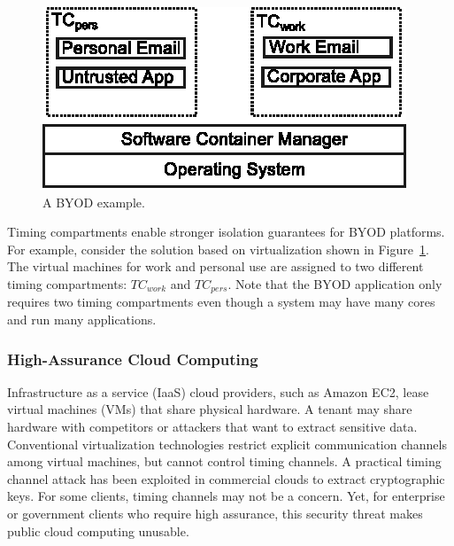 \begin{figure}
    \begin{center}
        \includegraphics{figs/byod.eps}
        \caption{A BYOD example.}
        \label{fig:byod}
        \vspace{-0.2in}
    \end{center}
\end{figure}

Timing compartments enable stronger isolation guarantees for BYOD
platforms. For example, consider the solution based on virtualization shown in 
Figure~\ref{fig:byod}. The virtual machines for
work and personal use are assigned to two different timing compartments:
$TC_{work}$ and $TC_{pers}$. 
Note that the BYOD application only requires two timing compartments even
though a system may have many cores and run many applications.

\subsubsection{High-Assurance Cloud Computing}

Infrastructure as a service (IaaS) cloud providers, such as Amazon EC2, lease virtual 
machines (VMs) that share physical hardware. 
A tenant may share hardware with competitors or attackers that want
to extract sensitive data. Conventional virtualization technologies restrict 
explicit
communication channels among virtual machines, but cannot control 
timing channels. A practical timing channel attack has been exploited
in commercial clouds to extract cryptographic keys\cite{heyyou}.
For some clients, timing channels may not be a concern. Yet, for enterprise or 
government clients who require high assurance,
this security threat makes public cloud computing unusable. 

